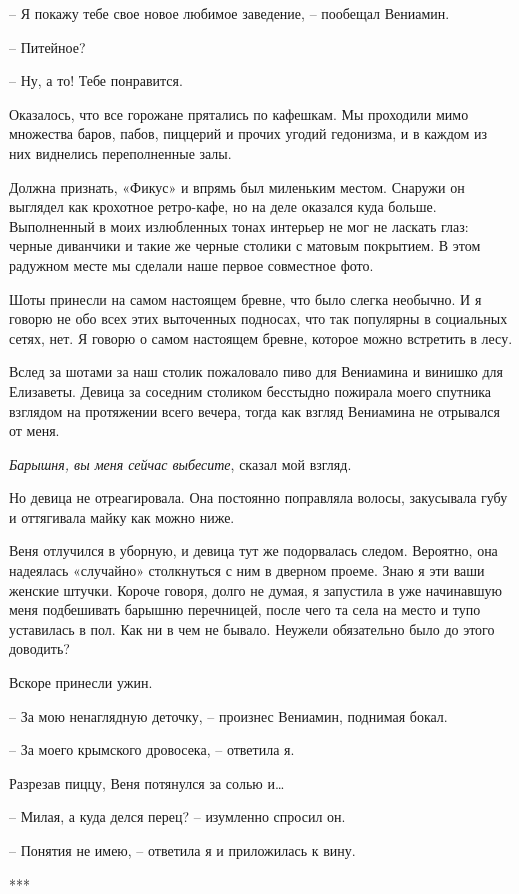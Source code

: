 \documentclass[
]{book}
\begin{document}
-- Я покажу тебе свое новое любимое заведение, -- пообещал Вениамин.

-- Питейное?

-- Ну, а то! Тебе понравится.

Оказалось, что все горожане прятались по кафешкам. Мы проходили мимо множества баров, пабов, пиццерий и прочих угодий гедонизма, и в каждом из них виднелись переполненные залы.

Должна признать, «Фикус» и впрямь был миленьким местом. Снаружи он выглядел как крохотное ретро-кафе, но на деле оказался куда больше. Выполненный в моих излюбленных тонах интерьер не мог не ласкать глаз: черные диванчики и такие же черные столики с матовым покрытием. В этом радужном месте мы сделали наше первое совместное фото.

Шоты принесли на самом настоящем бревне, что было слегка необычно. И я говорю не обо всех этих выточенных подносах, что так популярны в социальных сетях, нет. Я говорю о самом настоящем бревне, которое можно встретить в лесу.

Вслед за шотами за наш столик пожаловало пиво для Вениамина и винишко для Елизаветы. Девица за соседним столиком бесстыдно пожирала моего спутника взглядом на протяжении всего вечера, тогда как взгляд Вениамина не отрывался от меня.

\emph{Барышня, вы меня сейчас выбесите}, сказал мой взгляд.

Но девица не отреагировала. Она постоянно поправляла волосы, закусывала губу и оттягивала майку как можно ниже.

Веня отлучился в уборную, и девица тут же подорвалась следом. Вероятно, она надеялась «случайно» столкнуться с ним в дверном проеме. Знаю я эти ваши женские штучки. Короче говоря, долго не думая, я запустила в уже начинавшую меня подбешивать барышню перечницей, после чего та села на место и тупо уставилась в пол. Как ни в чем не бывало. Неужели обязательно было до этого доводить?

Вскоре принесли ужин.

-- За мою ненаглядную деточку, -- произнес Вениамин, поднимая бокал.

-- За моего крымского дровосека, -- ответила я.

Разрезав пиццу, Веня потянулся за солью и\ldots{}

-- Милая, а куда делся перец? -- изумленно спросил он.

-- Понятия не имею, -- ответила я и приложилась к вину.

***
\end{document}

